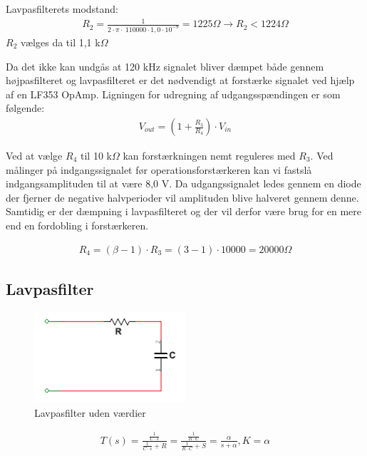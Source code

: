Lavpasfilterets modstand:
\begin{align}
R_2 = \frac{1}{2 \cdot \pi \cdot \ 110000 \cdot 1,0 \cdot 10^{-9}} = 1225 \Omega
\rightarrow R_2 < 1224 \Omega
\end{align}
$R_2$ vælges da til 1,1 k$\Omega$

Da det ikke kan undgås at 120 kHz signalet bliver dæmpet både gennem højpasfilteret og lavpasfilteret er det nødvendigt at forstærke signalet ved hjælp af en LF353 OpAmp.
Ligningen for udregning af udgangsspændingen er som følgende:
\begin{align}
V_{out} = (1 + \frac{R_3}{R_4}) \cdot V_{in}
\end{align} 

Ved at vælge $R_4$ til 10 k$\Omega$ kan forstærkningen nemt reguleres med $R_3$.
Ved målinger på indgangssignalet før operationsforstærkeren kan vi fastslå indgangsamplituden til at være 8,0 V. Da udgangssignalet ledes gennem en diode der fjerner de negative halvperioder vil amplituden blive halveret gennem denne. Samtidig er der dæmpning i lavpasfilteret og der vil derfor være brug for en mere end en fordobling i forstærkeren. 

\begin{align}
R_4 = (\beta - 1) \cdot R_3 = (3 - 1) \cdot 10000 = 20000 \Omega
\end{align} 

\newpage

\subsection{Lavpasfilter}

\begin{figure}[htbp]
	\centering
	\includegraphics[width=0.50\textwidth]{billeder/HWdesign/LP_UV.png}
	\caption{Lavpasfilter uden værdier}
	\label{fig:LP_UV}
\end{figure}


\begin{align}
\label{eq: LP_networkfunction}T(s) = \frac{\frac{1}{C \cdot s}}{\frac{1}{C \cdot s} + R} = \frac{\frac{1}{R \cdot C}}{\frac{1}{R \cdot C}+S}  = \frac{\alpha}{s + \alpha} , K= \alpha
\end{align}

